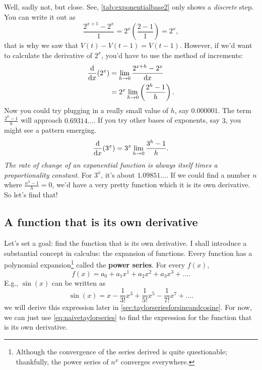 Well, sadly not, but close. See, \cref{tab:exponentialbase2} only shows a \emph{discrete} step. You can write it out as
\begin{equation}
    \frac{2^{x + 1} - 2^x}{1} = 2^x\left(\frac{2 - 1}{1}\right) = 2^x,
\end{equation}
that is why we saw that $V(t) - V(t - 1) = V(t - 1)$. However, if we'd want to calculate the derivative of $2^x$, you'd have to use the method of increments:
\begin{align*}
    \dv{x}(2^x) &= \lim_{h \rightarrow 0}\frac{2^{x + h} - 2^x}{\dd{x}} \\
    &= 2^x\lim_{h \rightarrow 0}\left(\frac{2^h - 1}{h}\right).
\end{align*}
Now you could try plugging in a really small value of $h$, say $0.000001$. The term $\frac{2^h - 1}{h}$ will approach $0.69314\dots$. If you try other bases of exponents, say $3$, you might see a pattern emerging.
\begin{equation}
    \dv{x}(3^x) = 3^x\lim_{h \rightarrow 0}\frac{3^h - 1}{h}.
\end{equation}
\emph{The rate of change of an exponential function is always itself times a proportionality constant}. For $3^x$, it's about $1.09851\dots$. If we could find a number $n$ where $\frac{n^h - 1}{h} = 0$, we'd have a very pretty function which it is its own derivative. So let's find that!
 
\subsection{A function that is its own derivative}
\label{sec:afunctionthatisitsownderivative}

Let's set a goal: find the function that is its own derivative. I shall introduce a substantial concept in calculus: the expansion of functions. Every function has a polynomial expansion\footnote{Although the convergence of the series derived is quite questionable; thankfully, the power series of $n^x$ converges everywhere.} called the \textbf{power series}. For every $f(x)$,
\begin{equation}
    f(x) = a_0 + a_1x^1 + a_2x^2 + a_3x^3 +\dots. \label{eq:naivetaylorseries}
\end{equation}
E.g., $\sin(x)$ can be written as
\begin{equation}
    \sin(x) = x - \frac{1}{3!}x^3 + \frac{1}{5!}x^5 - \frac{1}{7!}x^7 + \dots. \label{eq:taylorseriessine}
\end{equation}
we will derive this expression later in \cref{sec:taylorseriesforsineandcosine}. For now, we can just use \cref{eq:naivetaylorseries} to find the expression for the function that is its own derivative.

